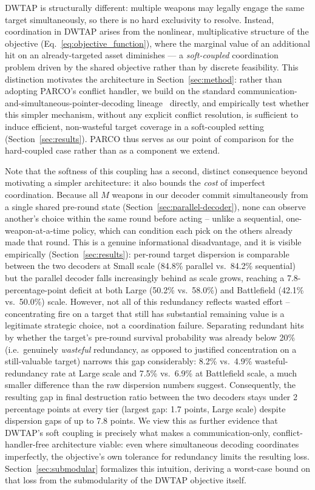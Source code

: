\documentclass[smallcondensed]{svjour3}
\begin{document}
DWTAP is structurally different: multiple weapons may legally engage the same target simultaneously, so there is no hard exclusivity to resolve. Instead, coordination in DWTAP arises from the nonlinear, multiplicative structure of the objective (Eq.~\eqref{eq:objective_function}), where the marginal value of an additional hit on an already-targeted asset diminishes — a \emph{soft-coupled} coordination problem driven by the shared objective rather than by discrete feasibility. This distinction motivates the architecture in Section~\ref{sec:method}: rather than adopting PARCO's conflict handler, we build on the standard communication-and-simultaneous-pointer-decoding lineage~\cite{sukhbaatar2016commnet,das2019tarmac,vinyals2015pointer} directly, and empirically test whether this simpler mechanism, without any explicit conflict resolution, is sufficient to induce efficient, non-wasteful target coverage in a soft-coupled setting (Section~\ref{sec:results}). PARCO thus serves as our point of comparison for the hard-coupled case rather than as a component we extend.

Note that the softness of this coupling has a second, distinct consequence beyond motivating a simpler architecture: it also bounds the \emph{cost} of imperfect coordination. Because all $M$ weapons in our decoder commit simultaneously from a single shared pre-round state (Section~\ref{sec:parallel-decoder}), none can observe another's choice within the same round before acting -- unlike a sequential, one-weapon-at-a-time policy, which can condition each pick on the others already made that round. This is a genuine informational disadvantage, and it is visible empirically (Section~\ref{sec:results}): per-round target dispersion is comparable between the two decoders at Small scale (84.8\% parallel vs.\ 84.2\% sequential) but the parallel decoder falls increasingly behind as scale grows, reaching a 7.8-percentage-point deficit at both Large (50.2\% vs.\ 58.0\%) and Battlefield (42.1\% vs.\ 50.0\%) scale. However, not all of this redundancy reflects wasted effort -- concentrating fire on a target that still has substantial remaining value is a legitimate strategic choice, not a coordination failure. Separating redundant hits by whether the target's pre-round survival probability was already below 20\% (i.e.\ genuinely \emph{wasteful} redundancy, as opposed to justified concentration on a still-valuable target) narrows this gap considerably: 8.2\% vs.\ 4.9\% wasteful-redundancy rate at Large scale and 7.5\% vs.\ 6.9\% at Battlefield scale, a much smaller difference than the raw dispersion numbers suggest. Consequently, the resulting gap in final destruction ratio between the two decoders stays under 2 percentage points at every tier (largest gap: 1.7 points, Large scale) despite dispersion gaps of up to 7.8 points. We view this as further evidence that DWTAP's soft coupling is precisely what makes a communication-only, conflict-handler-free architecture viable: even where simultaneous decoding coordinates imperfectly, the objective's own tolerance for redundancy limits the resulting loss. Section~\ref{sec:submodular} formalizes this intuition, deriving a worst-case bound on that loss from the submodularity of the DWTAP objective itself.
\end{document}
